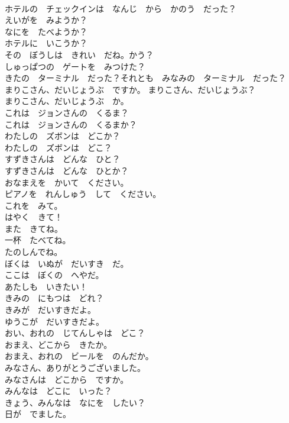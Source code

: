 \documentclass[8pt]{extreport}
\begin{document}
\begin{CJK}{UTF8}{min}
\\	ホテルの　チェックインは　なんじ　から　かのう　だった？	
\\	えいがを　みようか？	
\\	なにを　たべようか？	
\\	ホテルに　いこうか？	
\\	その　ぼうしは　きれい　だね。かう？	
\\	しゅっぱつの　ゲートを　みつけた？	
\\	きたの　ターミナル　だった？それとも　みなみの　ターミナル　だった？	
\\	まりこさん、だいじょうぶ　ですか。 まりこさん、だいじょうぶ？	
\\	まりこさん、だいじょうぶ　か。	
\\	これは　ジョンさんの　くるま？	
\\	これは　ジョンさんの　くるまか？	
\\	わたしの　ズボンは　どこか？	
\\	わたしの　ズボンは　どこ？	
\\	すずきさんは　どんな　ひと？	
\\	すずきさんは　どんな　ひとか？	
\\	おなまえを　かいて　ください。	
\\	ピアノを　れんしゅう　して　ください。	
\\	これを　みて。	
\\	はやく　きて！	
\\	また　きてね。	
\\	一杯　たべてね。	
\\	たのしんでね。	
\\	ぼくは　いぬが　だいすき　だ。	
\\	ここは　ぼくの　へやだ。	
\\	あたしも　いきたい！	
\\	きみの　にもつは　どれ？	
\\	きみが　だいすきだよ。	
\\	ゆうこが　だいすきだよ。	
\\	おい、おれの　じてんしゃは　どこ？	
\\	おまえ、どこから　きたか。	
\\	おまえ、おれの　ビールを　のんだか。	
\\	みなさん、ありがとうございました。	
\\	みなさんは　どこから　ですか。	
\\	みんなは　どこに　いった？	
\\	きょう、みんなは　なにを　したい？	
\\	日が　でました。	

\end{CJK}
\end{document}
